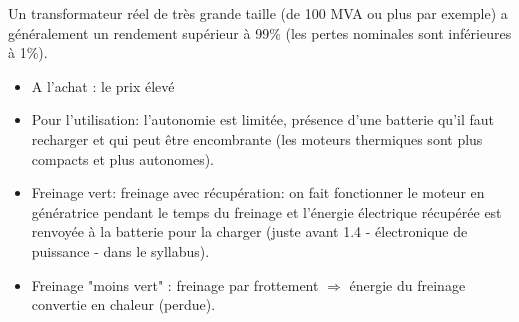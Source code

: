 \begin{questions}
\begin{solution}
Un transformateur réel de très grande taille (de 100 MVA ou plus par exemple) a généralement un rendement supérieur à 99\% (les pertes nominales sont inférieures à 1\%).
\end{solution}

\begin{solution}
\begin{itemize}
\item A l'achat : le prix élevé
\item Pour l'utilisation:  l'autonomie est limitée,  présence d'une batterie qu'il faut recharger et qui peut être encombrante (les moteurs thermiques sont plus compacts et plus autonomes). %
\end{itemize}

\begin{itemize}
\item Freinage vert:  freinage avec récupération: on fait fonctionner le moteur en génératrice pendant le temps du freinage et l'énergie électrique récupérée est renvoyée à la batterie pour la charger (juste avant 1.4 - électronique de puissance - dans le syllabus).
\item Freinage "moins vert" : freinage par frottement  $\Rightarrow$ énergie du freinage convertie en chaleur (perdue).
\end{itemize}

\end{solution}


\end{questions}
